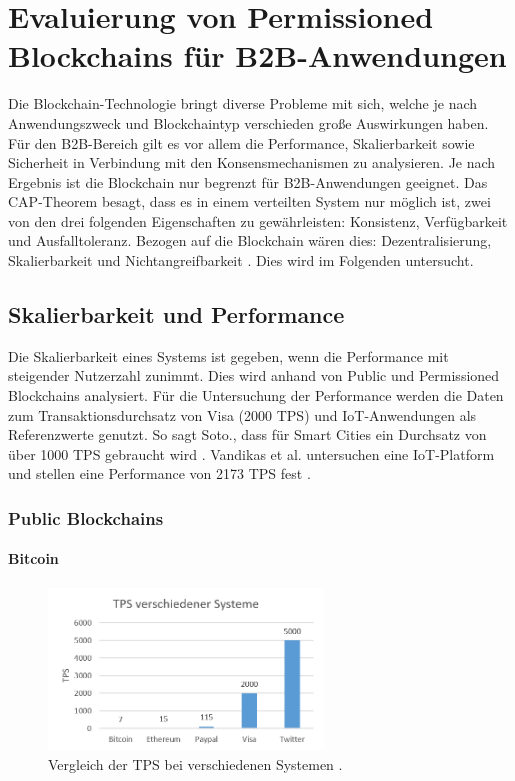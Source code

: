 \chapter{Evaluierung von Permissioned Blockchains für B2B-Anwendungen}
\label{cha:b2b-eval}

Die Blockchain-Technologie bringt diverse Probleme mit sich, welche je nach Anwendungszweck und Blockchaintyp verschieden große Auswirkungen haben. Für den B2B-Bereich gilt es vor allem die Performance, Skalierbarkeit sowie Sicherheit in Verbindung mit den Konsensmechanismen zu analysieren. Je nach Ergebnis ist die Blockchain nur begrenzt für B2B-Anwendungen geeignet. Das CAP-Theorem besagt, dass es in einem verteilten System nur möglich ist, zwei von den drei folgenden Eigenschaften zu gewährleisten: Konsistenz, Verfügbarkeit und Ausfalltoleranz. Bezogen auf die Blockchain wären dies: Dezentralisierung, Skalierbarkeit und Nichtangreifbarkeit \cite{SchererPerformanceScalabilityBlockchain2017}. Dies wird im Folgenden untersucht.

\section{Skalierbarkeit und Performance}
\label{sec:scalability-eval}
Die Skalierbarkeit eines Systems ist gegeben, wenn die Performance mit steigender Nutzerzahl zunimmt. Dies wird anhand von Public und Permissioned Blockchains analysiert. Für die Untersuchung der Performance werden die Daten zum Transaktionsdurchsatz von Visa (2000 \acs{TPS}) und IoT-Anwendungen als Referenzwerte genutzt. So sagt Soto., dass für Smart Cities ein Durchsatz von über 1000 \acs{TPS} gebraucht wird \cite{AraujoSotoPerformanceevaluationscalable2017}. Vandikas et al. untersuchen eine IoT-Platform und stellen eine Performance von 2173 \acs{TPS} fest \cite{VandikasPerformanceEvaluationIoT2014}. 

\subsection{Public Blockchains}


\subsubsection{Bitcoin}

\begin{figure}[!htbp]
  \centering
    \includegraphics[width=0.65\textwidth,angle=0]{images/tps-comparison}
    \caption{Vergleich der TPS bei verschiedenen Systemen \cite[S.~28]{SwanBlockchainblueprintnew2015}\cite{BitcoinTeamScalabilityBitcoinWiki}.}
    \label{fig:tps-comparison}
\end{figure} 

